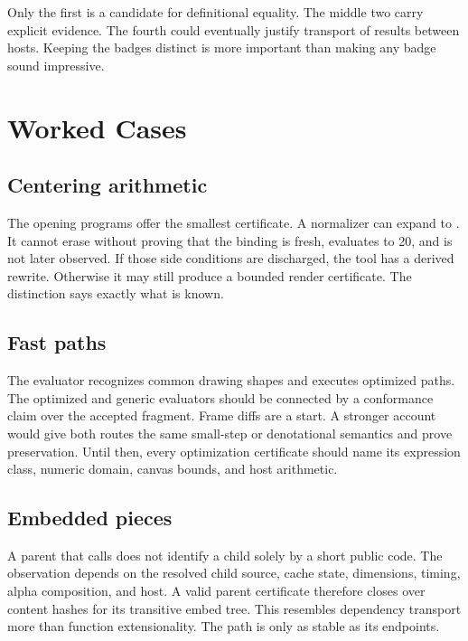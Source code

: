 \documentclass[10pt,letterpaper,twocolumn]{article}
\newcommand{\code}[1]{\texttt{\detokenize{#1}}}
\begin{document}
Only the first is a candidate for definitional equality. The middle two carry explicit evidence. The fourth could eventually justify transport of results between hosts. Keeping the badges distinct is more important than making any badge sound impressive.

\section{Worked Cases}
\label{sec:cases}

\subsection{Centering arithmetic}

The opening programs offer the smallest certificate. A normalizer can expand \code{w/2} to \code{(/ w 2)}. It cannot erase \code{def radius} without proving that the binding is fresh, evaluates to 20, and is not later observed. If those side conditions are discharged, the tool has a derived rewrite. Otherwise it may still produce a bounded render certificate. The distinction says exactly what is known.

\subsection{Fast paths}

The evaluator recognizes common \code{repeat} drawing shapes and executes optimized paths. The optimized and generic evaluators should be connected by a conformance claim over the accepted fragment. Frame diffs are a start. A stronger account would give both routes the same small-step or denotational semantics and prove preservation. Until then, every optimization certificate should name its expression class, numeric domain, canvas bounds, and host arithmetic.

\subsection{Embedded pieces}

A parent that calls \code{$39i} does not identify a child solely by a short public code. The observation depends on the resolved child source, cache state, dimensions, timing, alpha composition, and host. A valid parent certificate therefore closes over content hashes for its transitive embed tree. This resembles dependency transport more than function extensionality. The path is only as stable as its endpoints.
\end{document}
